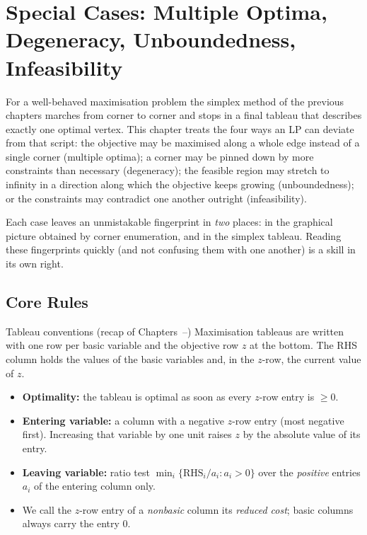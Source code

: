 \chapter{Special Cases: Multiple Optima, Degeneracy, Unboundedness,
  Infeasibility}

For a well-behaved maximisation problem the simplex method of the previous
chapters marches from corner to corner and stops in a final tableau that
describes exactly one optimal vertex. This chapter treats the four ways an
LP can deviate from that script: the objective may be maximised along a
whole edge instead of a single corner (multiple optima); a corner may be pinned down by more constraints
than necessary (degeneracy); the feasible region may stretch
to infinity in a direction along which the objective keeps growing
(unboundedness); or the constraints may contradict
one another outright (infeasibility).

Each case leaves an unmistakable fingerprint in \emph{two} places: in the
graphical picture obtained by corner enumeration, and in the simplex
tableau. Reading these fingerprints quickly (and not confusing them with
one another) is a skill in its own right.

\section{Core Rules}

\begin{rulebox}{Tableau conventions (recap of Chapters~--)}
Maximisation tableaus are written with one row per basic variable and the
objective row $z$ at the bottom. The RHS column holds the values of the
basic variables and, in the $z$-row, the current value of $z$.
\begin{itemize}[leftmargin=1.6em,itemsep=0.3ex]
  \item \textbf{Optimality:} the tableau is optimal as soon as every
        $z$-row entry is $\ge 0$.
  \item \textbf{Entering variable:} a column with a negative $z$-row entry
        (most negative first). Increasing that variable by one unit raises
        $z$ by the absolute value of its entry.
  \item \textbf{Leaving variable:} ratio test
        $\min_i \{\text{RHS}_i/a_i : a_i>0\}$ over the \emph{positive}
        entries $a_i$ of the entering column only.
  \item We call the $z$-row entry of a \emph{nonbasic} column its
        \emph{reduced cost}; basic columns always carry the entry $0$.
\end{itemize}
\end{rulebox}

